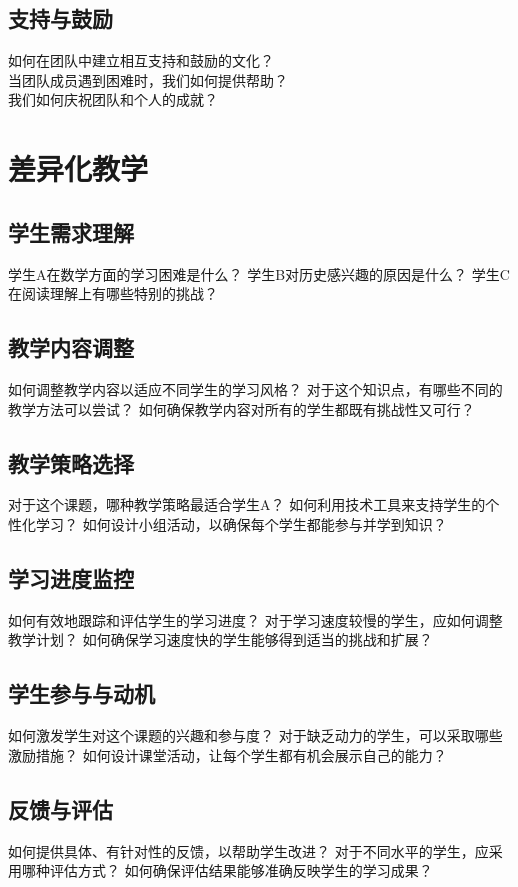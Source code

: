 \documentclass[12pt]{book}
\begin{document}
\subsection{支持与鼓励}
如何在团队中建立相互支持和鼓励的文化？\\
当团队成员遇到困难时，我们如何提供帮助？\\
我们如何庆祝团队和个人的成就？\\


\section{差异化教学}
\subsection{学生需求理解}
学生A在数学方面的学习困难是什么？
学生B对历史感兴趣的原因是什么？
学生C在阅读理解上有哪些特别的挑战？

\subsection{教学内容调整}
如何调整教学内容以适应不同学生的学习风格？
对于这个知识点，有哪些不同的教学方法可以尝试？
如何确保教学内容对所有的学生都既有挑战性又可行？

\subsection{教学策略选择}
对于这个课题，哪种教学策略最适合学生A？
如何利用技术工具来支持学生的个性化学习？
如何设计小组活动，以确保每个学生都能参与并学到知识？

\subsection{学习进度监控}
如何有效地跟踪和评估学生的学习进度？
对于学习速度较慢的学生，应如何调整教学计划？
如何确保学习速度快的学生能够得到适当的挑战和扩展？

\subsection{学生参与与动机}
如何激发学生对这个课题的兴趣和参与度？
对于缺乏动力的学生，可以采取哪些激励措施？
如何设计课堂活动，让每个学生都有机会展示自己的能力？

\subsection{反馈与评估}
如何提供具体、有针对性的反馈，以帮助学生改进？
对于不同水平的学生，应采用哪种评估方式？
如何确保评估结果能够准确反映学生的学习成果？
\end{document}
